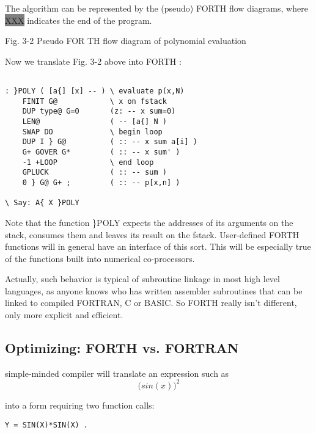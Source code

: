 
The algorithm can be represented by the (pseudo) FORTH ﬂow
diagrams, where
{\colorbox{gray}{\color{gray}XXX}} indicates the end of the program.

 

 

Fig. 3-2 Pseudo FOR TH flow diagram of polynomial evaluation

Now we translate Fig. 3-2 above into FORTH  :

\begin{verbatim}

: }POLY ( [a{] [x] -- ) \ evaluate p(x,N)
    FINIT G@            \ x on fstack
    DUP type@ G=O       (z: -- x sum=0)
    LEN@                ( -- [a{] N )
    SWAP DO             \ begin loop
    DUP I } G@          ( :: -- x sum a[i] )
    G+ GOVER G*         ( :: -- x sum' )
    -1 +LOOP            \ end loop
    GPLUCK              ( :: -- sum )
    0 } G@ G+ ;         ( :: -- p[x,n] )

\ Say: A{ X }POLY

\end{verbatim}

Note that the function \}POLY expects the addresses of its arguments on the
stack, consumes them and leaves its result on the fstack. User-defined FORTH
functions will in general have an interface of this sort. This will be
especially true of the functions built into numerical co-processors.

Actually, such behavior is typical of subroutine linkage in most high
level languages, as anyone knows who has written assembler subroutines that can
be linked to compiled FORTRAN, C or BASIC.
So FORTH really isn't different, only more explicit and efficient.

\subsection{Optimizing: FORTH vs. FORTRAN}
 simple-minded compiler will translate an expression such as
\begin{equation}
     \Big( sin(x) \Big)^2
\end{equation}

into a form requiring two function calls:

\begin{verbatim}
Y = SIN(X)*SIN(X) .
\end{verbatim}

